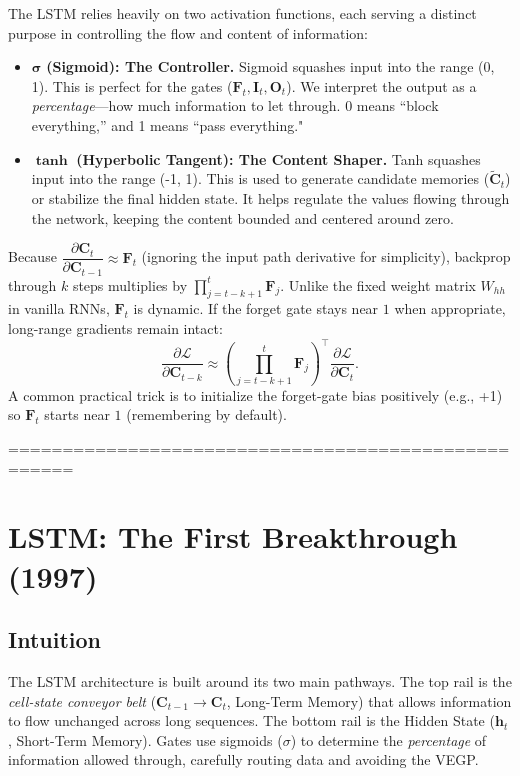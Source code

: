 \documentclass{article}
\begin{document}
\begin{tcolorbox}[colback=yellow!5!white, colframe=yellow!70!black, title=Key Components: Sigmoid vs. Tanh]
The LSTM relies heavily on two activation functions, each serving a distinct purpose in controlling the flow and content of information:

\begin{itemize}
    \item $\boldsymbol{\sigma}$ \textbf{(Sigmoid): The Controller.} Sigmoid squashes input into the range (0, 1). This is perfect for the gates ($\mathbf{F}_t, \mathbf{I}_t, \mathbf{O}_t$). We interpret the output as a \emph{percentage}—how much information to let through. 0 means ``block everything,'' and 1 means ``pass everything."
    \item $\boldsymbol{\tanh}$ \textbf{(Hyperbolic Tangent): The Content Shaper.} Tanh squashes input into the range (-1, 1). This is used to generate candidate memories ($\tilde{\mathbf{C}}_t$) or stabilize the final hidden state. It helps regulate the values flowing through the network, keeping the content bounded and centered around zero.
\end{itemize}
\end{tcolorbox}

\begin{tcolorbox}[colback=green!5!white,colframe=green!60!black,title=Gradient highway]
Because $\dfrac{\partial \mathbf{C}_t}{\partial \mathbf{C}_{t-1}}\approx\mathbf{F}_t$ (ignoring the input path derivative for simplicity), backprop through $k$ steps multiplies by $\prod_{j=t-k+1}^{t}\mathbf{F}_j$. Unlike the fixed weight matrix $W_{hh}$ in vanilla RNNs, $\mathbf{F}_t$ is dynamic. If the forget gate stays near $1$ when appropriate, long-range gradients remain intact:
\[
\frac{\partial \mathcal{L}}{\partial \mathbf{C}_{t-k}}\approx\left(\prod_{j=t-k+1}^{t}\mathbf{F}_j\right)^\top\!\frac{\partial \mathcal{L}}{\partial \mathbf{C}_{t}}.
\]
A common practical trick is to initialize the forget-gate bias positively (e.g., +1) so $\mathbf{F}_t$ starts near $1$ (remembering by default).
\end{tcolorbox}


====================================================
\section{LSTM: The First Breakthrough (1997)}

\subsection{Intuition}
The LSTM architecture is built around its two main pathways. The top rail is the \emph{cell-state conveyor belt} ($\mathbf{C}_{t-1}\!\to\!\mathbf{C}_t$, Long-Term Memory) that allows information to flow unchanged across long sequences. The bottom rail is the Hidden State ($\mathbf{h}_t$, Short-Term Memory). Gates use sigmoids ($\sigma$) to determine the \emph{percentage} of information allowed through, carefully routing data and avoiding the VEGP.
\end{document}
